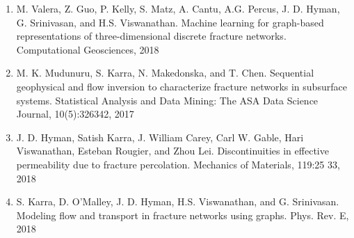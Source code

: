 \documentclass[letterpaper,10pt,english]{sphinxmanual}
\begin{document}
\begin{enumerate}
\item {} 
M. Valera, Z. Guo, P. Kelly, S. Matz, A. Cantu, A.G. Percus, J. D. Hyman, G. Srinivasan, and H.S. Viswanathan. Machine learning for graph-based representations of three-dimensional discrete fracture networks. Computational Geosciences, 2018

\item {} 
M. K. Mudunuru, S. Karra, N. Makedonska, and T. Chen. Sequential geophysical and flow inversion to characterize fracture networks in subsurface systems. Statistical Analysis and Data Mining: The ASA Data Science Journal, 10(5):326\textendash{}342, 2017

\item {} 
J. D. Hyman, Satish Karra, J. William Carey, Carl W. Gable, Hari Viswanathan, Esteban Rougier, and Zhou Lei. Discontinuities in effective permeability due to fracture percolation. Mechanics of Materials, 119:25 \textendash{} 33, 2018

\item {} 
S. Karra, D. O’Malley, J. D. Hyman, H.S. Viswanathan, and G. Srinivasan. Modeling flow and transport in fracture networks using graphs. Phys. Rev. E, 2018

\end{enumerate}



\renewcommand{\indexname}{Index}
\printindex
\end{document}
